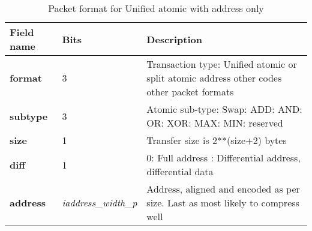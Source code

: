 \begin{table}[htp]
  \centering
  \caption{Packet format for Unified atomic with address only}
  \label{tab:te_datadx0y6}
  \begin{tabulary}{\textwidth}{|l|p{40mm}|p{90mm}|}
    \hline
    {\bf Field name} & {\bf Bits} & {\bf Description} \\
    \hline
    \textbf{format} & 	3	& Transaction type: Unified atomic or split atomic address\newline	
		other codes other packet formats\\
    \hline
    \textbf{subtype} & 	3	& Atomic sub-type: Swap: ADD: AND: OR: XOR: MAX: MIN: reserved\\	
    \hline
    \textbf{size} & 1 & Transfer size is 2**(size+2) bytes\\
    \hline
    \textbf{diff} & 1 & 0: Full address : Differential address, differential data\\
    \hline
    \textbf{address} &  \textit {iaddress\_width\_p} &Address, aligned and encoded as per size. Last as most likely to compress well \\
    \hline
  \end{tabulary}
\end{table}



